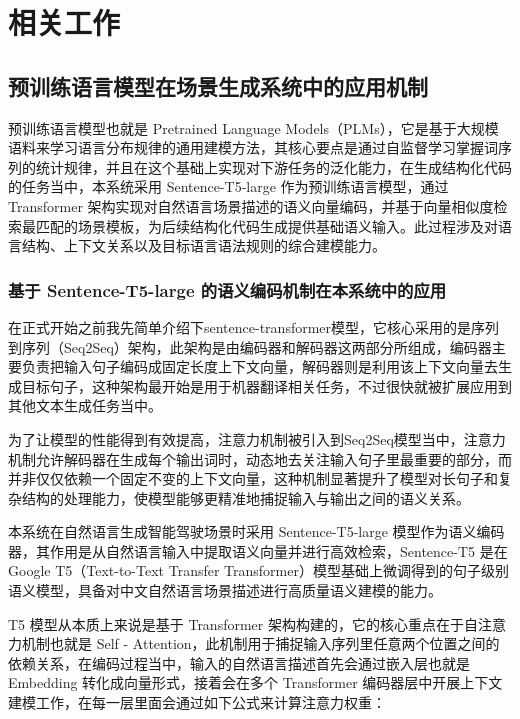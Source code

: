 \chapter{相关工作}

\section{预训练语言模型在场景生成系统中的应用机制}

预训练语言模型也就是 Pretrained Language Models（PLMs），它是基于大规模语料来学习语言分布规律的通用建模方法，其核心要点是通过自监督学习掌握词序列的统计规律，并且在这个基础上实现对下游任务的泛化能力，在生成结构化代码的任务当中，本系统采用 Sentence-T5-large 作为预训练语言模型，通过 Transformer 架构实现对自然语言场景描述的语义向量编码，并基于向量相似度检索最匹配的场景模板，为后续结构化代码生成提供基础语义输入。此过程涉及对语言结构、上下文关系以及目标语言语法规则的综合建模能力。

\subsection{基于 Sentence-T5-large 的语义编码机制在本系统中的应用}

在正式开始之前我先简单介绍下sentence-transformer模型，它核心采用的是序列到序列（Seq2Seq）架构，此架构是由编码器和解码器这两部分所组成，编码器主要负责把输入句子编码成固定长度上下文向量，解码器则是利用该上下文向量去生成目标句子，这种架构最开始是用于机器翻译相关任务，不过很快就被扩展应用到其他文本生成任务当中。

为了让模型的性能得到有效提高，注意力机制被引入到Seq2Seq模型当中，注意力机制允许解码器在生成每个输出词时，动态地去关注输入句子里最重要的部分，而并非仅仅依赖一个固定不变的上下文向量，这种机制显著提升了模型对长句子和复杂结构的处理能力，使模型能够更精准地捕捉输入与输出之间的语义关系。

本系统在自然语言生成智能驾驶场景时采用 Sentence-T5-large 模型作为语义编码器，其作用是从自然语言输入中提取语义向量并进行高效检索，Sentence-T5 是在 Google T5（Text-to-Text Transfer Transformer）模型基础上微调得到的句子级别语义模型，具备对中文自然语言场景描述进行高质量语义建模的能力。

T5 模型从本质上来说是基于 Transformer 架构构建的，它的核心重点在于自注意力机制也就是 Self - Attention，此机制用于捕捉输入序列里任意两个位置之间的依赖关系，在编码过程当中，输入的自然语言描述首先会通过嵌入层也就是 Embedding 转化成向量形式，接着会在多个 Transformer 编码器层中开展上下文建模工作，在每一层里面会通过如下公式来计算注意力权重：

